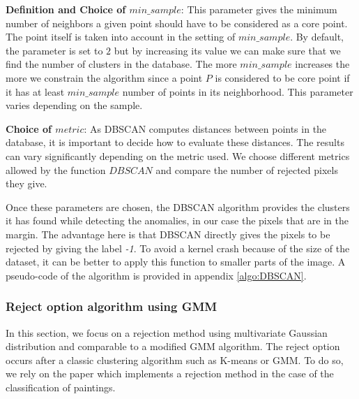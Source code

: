 \documentclass{siamart171218}
\begin{document}

\textbf{Definition and Choice of $min\_sample$}: This parameter gives the minimum number of neighbors a given point should have to be considered as a core point. The point itself is taken into account in the setting of $min\_sample$. By default, the parameter is set to $2$ but by increasing its value we can make sure that we find the number of clusters in the database. The more $min\_sample$ increases the more we constrain the algorithm since a point $P$ is considered to be core point if it has at least $min\_sample$ number of points in its neighborhood. This parameter varies depending on the sample. \newline

\textbf{Choice of $metric$}: As DBSCAN computes distances between points in the database, it is important to decide how to evaluate these distances. The results can vary significantly depending on the metric used. We choose different metrics allowed by the function $DBSCAN$ and compare the number of rejected pixels they give. \newline

Once these parameters are chosen, the DBSCAN algorithm provides the clusters it has found while detecting the anomalies, in our case the pixels that are in the margin. The advantage here is that DBSCAN directly gives the pixels to be rejected by giving the label \textit{-1}. To avoid a kernel crash because of the size of the dataset, it can be better to apply this function to smaller parts of the image. A pseudo-code of the algorithm is provided in appendix \ref{algo:DBSCAN}.

\subsubsection{Reject option algorithm using GMM}
\label{section:Reject_maultivariate_gaussian}

In this section, we focus on a rejection method using multivariate Gaussian distribution and comparable to a modified GMM algorithm. The reject option occurs after a classic clustering algorithm such as K-means or GMM. To do so, we rely on the paper \cite {deng2019selective} which implements a rejection method in the case of the classification of paintings. \\
\end{document}
